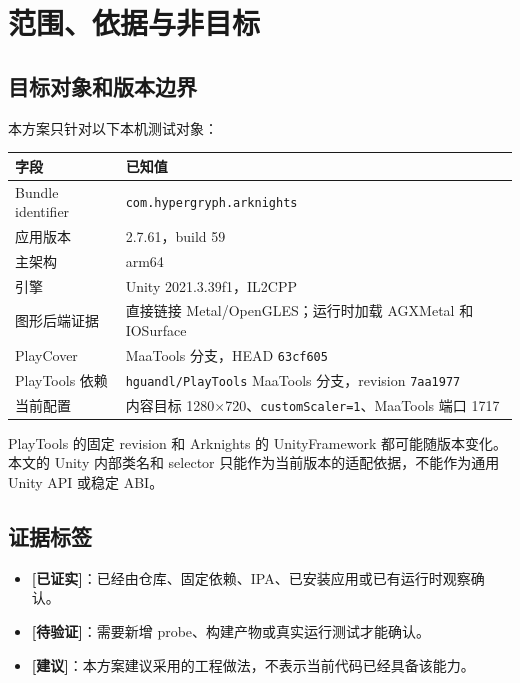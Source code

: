 \documentclass[UTF8,a4paper,11pt]{ctexart}
\newcommand{\verified}{\textbf{\color{verified}[已证实]}}
\newcommand{\pending}{\textbf{\color{pending}[待验证]}}
\newcommand{\recommend}{\textbf{\color{recommend}[建议]}}
\begin{document}
\section{范围、依据与非目标}

\subsection{目标对象和版本边界}

本方案只针对以下本机测试对象：

\begin{center}
\small
\begin{tabularx}{\textwidth}{>{\raggedright\arraybackslash}p{} X}
\toprule
字段 & 已知值 \\
\midrule
Bundle identifier & \texttt{com.hypergryph.arknights} \\
应用版本 & 2.7.61，build 59 \\
主架构 & arm64 \\
引擎 & Unity 2021.3.39f1，IL2CPP \\
图形后端证据 & 直接链接 Metal/OpenGLES；运行时加载 AGXMetal 和 IOSurface \\
PlayCover & MaaTools 分支，HEAD \texttt{63cf605} \\
PlayTools 依赖 & \texttt{hguandl/PlayTools} MaaTools 分支，revision \texttt{7aa1977} \\
当前配置 & 内容目标 1280\(\times\)720、\texttt{customScaler=1}、MaaTools 端口 1717 \\
\bottomrule
\end{tabularx}
\end{center}

PlayTools 的固定 revision 和 Arknights 的 UnityFramework 都可能随版本变化。本文的 Unity 内部类名和 selector 只能作为当前版本的适配依据，不能作为通用 Unity API 或稳定 ABI。

\subsection{证据标签}

\begin{itemize}
  \item \verified{}：已经由仓库、固定依赖、IPA、已安装应用或已有运行时观察确认。
  \item \pending{}：需要新增 probe、构建产物或真实运行测试才能确认。
  \item \recommend{}：本方案建议采用的工程做法，不表示当前代码已经具备该能力。
\end{itemize}
\end{document}
